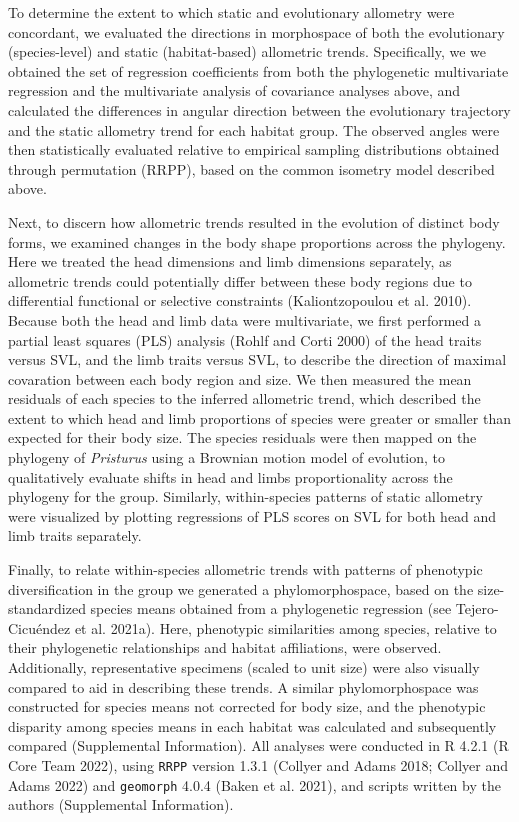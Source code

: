\documentclass[
  11pt,
]{article}
\begin{document}
To determine the extent to which static and evolutionary allometry were
concordant, we evaluated the directions in morphospace of both the
evolutionary (species-level) and static (habitat-based) allometric
trends. Specifically, we we obtained the set of regression coefficients
from both the phylogenetic multivariate regression and the multivariate
analysis of covariance analyses above, and calculated the differences in
angular direction between the evolutionary trajectory and the static
allometry trend for each habitat group. The observed angles were then
statistically evaluated relative to empirical sampling distributions
obtained through permutation (RRPP), based on the common isometry model
described above. \hfill\break

Next, to discern how allometric trends resulted in the evolution of
distinct body forms, we examined changes in the body shape proportions
across the phylogeny. Here we treated the head dimensions and limb
dimensions separately, as allometric trends could potentially differ
between these body regions due to differential functional or selective
constraints (Kaliontzopoulou et al. 2010). Because both the head and
limb data were multivariate, we first performed a partial least squares
(PLS) analysis (Rohlf and Corti 2000) of the head traits versus SVL, and
the limb traits versus SVL, to describe the direction of maximal
covaration between each body region and size. We then measured the mean
residuals of each species to the inferred allometric trend, which
described the extent to which head and limb proportions of species were
greater or smaller than expected for their body size. The species
residuals were then mapped on the phylogeny of \emph{Pristurus} using a
Brownian motion model of evolution, to qualitatively evaluate shifts in
head and limbs proportionality across the phylogeny for the group.
Similarly, within-species patterns of static allometry were visualized
by plotting regressions of PLS scores on SVL for both head and limb
traits separately. \hfill\break

Finally, to relate within-species allometric trends with patterns of
phenotypic diversification in the group we generated a phylomorphospace,
based on the size-standardized species means obtained from a
phylogenetic regression (see Tejero-Cicuéndez et al. 2021a). Here,
phenotypic similarities among species, relative to their phylogenetic
relationships and habitat affiliations, were observed. Additionally,
representative specimens (scaled to unit size) were also visually
compared to aid in describing these trends. A similar phylomorphospace
was constructed for species means not corrected for body size, and the
phenotypic disparity among species means in each habitat was calculated
and subsequently compared (Supplemental Information). All analyses were
conducted in R 4.2.1 (R Core Team 2022), using \texttt{RRPP} version
1.3.1 (Collyer and Adams 2018; Collyer and Adams 2022) and
\texttt{geomorph} 4.0.4 (Baken et al. 2021), and scripts written by the
authors (Supplemental Information).
\end{document}
